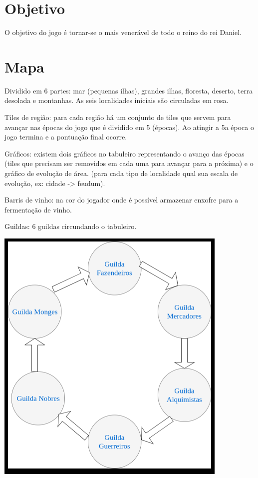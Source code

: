 \documentclass[11pt]{article}
\author{Fabio Favero Henkes}
\date{\today}
\title{}
\begin{document}
\tableofcontents

\section{Objetivo}
\label{sec:orgheadline1}

O objetivo do jogo é tornar-se o mais venerável de todo o reino do rei Daniel.

\section{Mapa}
\label{sec:orgheadline2}

Dividido em 6 partes: mar (pequenas ilhas), grandes ilhas, floresta, deserto, terra desolada e montanhas. As seis localidades iniciais são circuladas em rosa.

Tiles de região: para cada região há um conjunto de tiles que servem para avançar nas épocas do jogo que é dividido em 5 (épocas). Ao atingir a 5a época o jogo termina e a pontuação final ocorre.

Gráficos: existem dois gráficos no tabuleiro representando o avanço das épocas (tiles que precisam ser removidos em cada uma para avançar para a próxima) e o gráfico de evolução de área.
(para cada tipo de localidade qual sua escala de evolução, ex: cidade -> feudum).

Barris de vinho: na cor do jogador onde é possível armazenar enxofre para a fermentação de vinho.

Guildas: 6 guildas circundando o tabuleiro.

\includegraphics[width=.9\linewidth]{./img/guilds.png}
\end{document}
